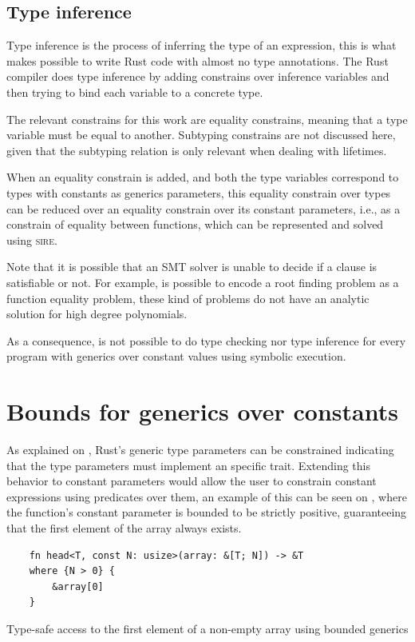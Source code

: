 \subsection{Type inference}

Type inference is the process of inferring the type of an expression, this is
what makes possible to write Rust code with almost no type annotations. The
Rust compiler does type inference by adding constrains over inference variables
and then trying to bind each variable to a concrete type.

The relevant constrains for this work are equality constrains, meaning that a
type variable must be equal to another. Subtyping constrains are not discussed
here, given that the subtyping relation is only relevant when dealing with
lifetimes.

When an equality constrain is added, and both the type variables correspond to
types with constants as generics parameters, this equality constrain over types
can be reduced over an equality constrain over its constant parameters, i.e.,
as a constrain of equality between functions, which can be represented and
solved using \textsc{sire}. 

Note that it is possible that an SMT solver is unable to decide if a clause is
satisfiable or not. For example, is possible to encode a root finding problem
as a function equality problem, these kind of problems do not have an analytic
solution for high degree polynomials.

As a consequence, is not possible to do type checking nor type inference for
every program with generics over constant values using symbolic execution.

\section{Bounds for generics over constants}

As explained on , Rust's generic type parameters can be
constrained indicating that the type parameters must implement an specific
trait. Extending this behavior to constant parameters would allow the user to
constrain constant expressions using predicates over them, an example of this
can be seen on , where the 
function's constant parameter  is bounded to be strictly positive,
guaranteeing that the first element of the array always exists. 

\begin{listing}[h]
	\begin{verbatim}
    fn head<T, const N: usize>(array: &[T; N]) -> &T
    where {N > 0} {
        &array[0]
    }
    \end{verbatim}
    \caption{Type-safe access to the first element of a non-empty array using bounded generics}
  \label{lst:head_const_generics}
\end{listing}

